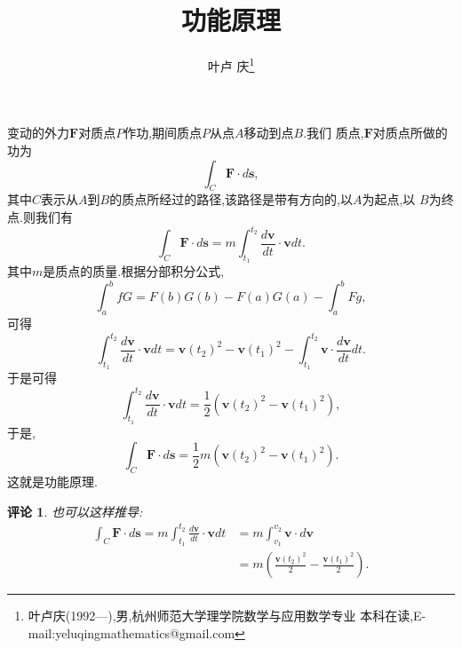 \documentclass[a4paper]{article}
\newtheorem*{rem}{评论}
\newenvironment{remark}
{\bigskip\begin{mdframed}\begin{rem}}
    {\end{rem}\end{mdframed}\bigskip}
\begin{document}
\title{\huge{\bf{功能原理}}} \author{\small{叶卢
    庆\footnote{叶卢庆(1992---),男,杭州师范大学理学院数学与应用数学专业
      本科在读,E-mail:yeluqingmathematics@gmail.com}}}
\maketitle\ni
变动的外力$\mathbf{F}$对质点$P$作功,期间质点$P$从点$A$移动到点$B$.我们
质点,$\mathbf{F}$对质点所做的功为
$$
\int_C \mathbf{F}\cdot d\mathbf{s},
$$
其中$C$表示从$A$到$B$的质点所经过的路径,该路径是带有方向的,以$A$为起点,以
$B$为终点.则我们有
$$
\int_C \mathbf{F}\cdot d\mathbf{s}=m\int_{t_{1}}^{t_{2}}
\frac{d\mathbf{v}}{dt}\cdot
\mathbf{v}dt.
$$
其中$m$是质点的质量.根据分部积分公式,
$$
\int_a^bfG=F(b)G(b)-F(a)G(a)-\int_a^bFg,
$$
可得
$$
\int_{t_1}^{t_2}\frac{d\mathbf{v}}{dt}\cdot
\mathbf{v}dt=\mathbf{v}(t_2)^2-\mathbf{v}(t_1)^2-\int_{t_1}^{t_2}\mathbf{v}\cdot \frac{d\mathbf{v}}{dt}dt.
$$
于是可得
$$
\int_{t_1}^{t_2}\frac{d\mathbf{v}}{dt}\cdot \mathbf{v}dt=\frac{1}{2}(\mathbf{v}(t_2)^2-\mathbf{v}(t_1)^2),
$$
于是,
$$
\int_C\mathbf{F}\cdot d\mathbf{s}=\frac{1}{2}m(\mathbf{v}(t_2)^2-\mathbf{v}(t_1)^2).
$$
这就是功能原理.
\begin{remark}
也可以这样推导:
\begin{align*}
  \int_C \mathbf{F}\cdot d\mathbf{s}=m\int_{t_{1}}^{t_{2}}
\frac{d\mathbf{v}}{dt}\cdot
\mathbf{v}dt&=m\int_{v_1}^{v_2}\mathbf{v}\cdot d\mathbf{v}\\&=m(\frac{\mathbf{v}(t_{2})^2}{2}-\frac{\mathbf{v}(t_{1})^2}{2}).
\end{align*}
\end{remark}
\end{document}
